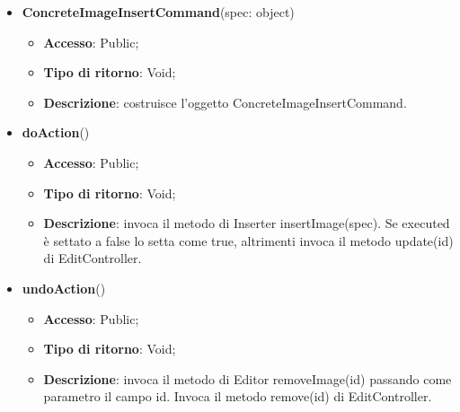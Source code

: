 {{{	
	\begin{itemize}
		\item \textbf{ConcreteImageInsertCommand}(spec: object)
		\begin{itemize}
			\item \textbf{Accesso}: Public;
			\item \textbf{Tipo di ritorno}: Void;
			\item \textbf{Descrizione}: costruisce l’oggetto ConcreteImageInsertCommand.
		\end{itemize}
		\item \textbf{doAction}()
		\begin{itemize}
			\item \textbf{Accesso}: Public;
			\item \textbf{Tipo di ritorno}: Void;
			\item \textbf{Descrizione}: invoca il metodo di Inserter insertImage(spec). Se executed è settato a false lo setta come true, altrimenti invoca il metodo update(id) di EditController.
		\end{itemize}
		\item \textbf{undoAction}()
		\begin{itemize}
			\item \textbf{Accesso}: Public;
			\item \textbf{Tipo di ritorno}: Void;
			\item \textbf{Descrizione}: invoca il metodo di Editor removeImage(id) passando come parametro il campo id. Invoca il metodo remove(id) di EditController.
		\end{itemize}
	\end{itemize}
	}
}}
